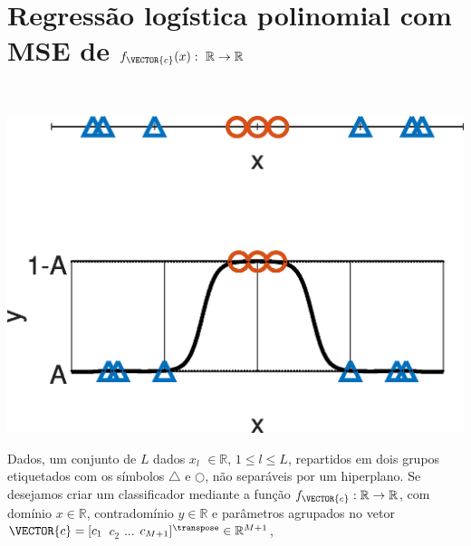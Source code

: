 \newpage

\section{Regressão logística polinomial com MSE de $f_{\VECTOR{c}}(x):~\mathbb{R} \rightarrow \mathbb{R}$}




\begin{theorem}\label{theo:reglogr1r1poly:1}
~\\
\noindent
\begin{minipage}{0.45\textwidth}
\centering
\includegraphics[width=0.95\linewidth]{chapters/classificacao/mfiles/reglogr1r1poly/reglogr1r1poly.eps} 
\end{minipage}
\begin{minipage}{0.55\textwidth}
Dados, um conjunto de $L$ dados 
$x_l$ $\in \mathbb{R}$, $1\leq l\leq L$,
repartidos em dois grupos etiquetados com os símbolos $\bigtriangleup$ e $\bigcirc$,
não separáveis por um hiperplano.
Se desejamos criar um classificador mediante 
a função  $f_{\VECTOR{c}}:\mathbb{R} \rightarrow \mathbb{R}$,
com domínio $x \in \mathbb{R}$, contradomínio $y \in \mathbb{R}$ e 
parâmetros agrupados no vetor $\VECTOR{c}=[c_1$ $c_2$ $...$ $c_{M+1}]^{\transpose}\in \mathbb{R}^{M+1}$,

\end{minipage}
\end{theorem}

